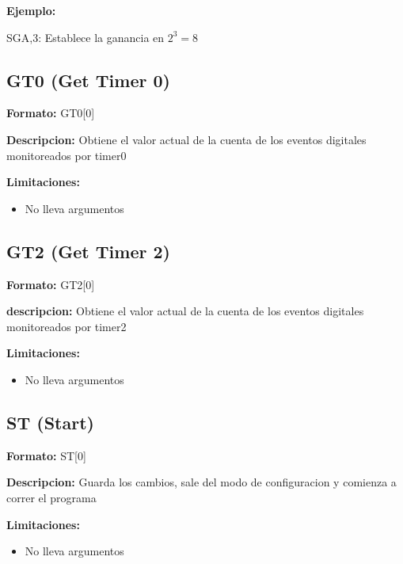 \textbf{Ejemplo:}

SGA,3: Establece la ganancia en $2^{3} = 8$


\subsection{GT0 (Get Timer 0)}

\textbf{Formato:} GT0[0]

\textbf{Descripcion:}
Obtiene el valor actual de la cuenta de los eventos digitales monitoreados por timer0

\textbf{Limitaciones:}
\begin{itemize}
  \item No lleva argumentos


\end{itemize}\subsection{GT2 (Get Timer 2)}

\textbf{Formato:} GT2[0]

\textbf{descripcion:}
Obtiene el valor actual de la cuenta de los eventos digitales monitoreados por timer2

\textbf{Limitaciones:}
\begin{itemize}
  \item No lleva argumentos
\end{itemize}

\subsection{ST (Start)}

\textbf{Formato:} ST[0]

\textbf{Descripcion:}
Guarda los cambios, sale del modo de configuracion y comienza a correr el programa

\textbf{Limitaciones:}
\begin{itemize}
  \item No lleva argumentos
\end{itemize}


\clearpage

